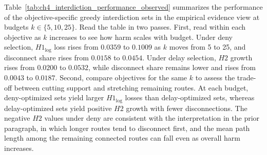 Table~\ref{tab:ch4_interdiction_performance_observed} summarizes the performance of the objective-specific greedy interdiction sets in the empirical evidence view at budgets $k\in\{5,10,25\}$. Read the table in two passes. First, read within each objective as $k$ increases to see how harm scales with budget. Under deny selection, $H1_{\log}$ loss rises from $0.0359$ to $0.1009$ as $k$ moves from 5 to 25, and disconnect share rises from $0.0158$ to $0.0454$. Under delay selection, $H2$ growth rises from $0.0200$ to $0.0532$, while disconnect share remains lower and rises from $0.0043$ to $0.0187$. Second, compare objectives for the same $k$ to assess the trade-off between cutting support and stretching remaining routes. At each budget, deny-optimized sets yield larger $H1_{\log}$ losses than delay-optimized sets, whereas delay-optimized sets yield positive $H2$ growth with fewer disconnections. The negative $H2$ values under deny are consistent with the interpretation in the prior paragraph, in which longer routes tend to disconnect first, and the mean path length among the remaining connected routes can fall even as overall harm increases.

\begin{table}[tbp]
  \centering
  \caption[\textit{Budget-$k$ interdiction performance (deny vs.\ delay)}]
  {\textit{Budget-$k$ interdiction performance (deny vs.\ delay).}}
  \label{tab:ch4_interdiction_performance_observed}

  \footnotesize
  \setlength{\tabcolsep}{6pt}
  \renewcommand{\arraystretch}{1.04}

  

  \captionsetup{justification=raggedright,singlelinecheck=false}
  \caption*{\footnotesize \textit{Note}. Results report greedy node-removal interdiction under the empirical evidence view (disclosed SCR ties plus observed shipping), evaluated at disruption budgets $k\in\{5,10,25\}$. For each objective, outcomes are computed after removing the objective-specific \emph{greedy} interdiction set of size $k$. \textit{Deny (H1)} selects nodes to maximize $H1_{\log}$ loss (log-obligation-weighted loss of semiconductor support reaching DoD Tier-1 prime endpoints). \textit{Delay (H2)} selects nodes to maximize $H2$ growth (change in mean shortest-path length among still-connected semi$\rightarrow$prime support paths relative to baseline). \textit{Disconnect share} is the fraction of primes that lose all semiconductor support after removal. Negative $H2$ growth under the deny objective reflects a composition effect: interdiction disconnects longer routes first, lowering the mean path length among the remaining connected routes.}
\end{table}


